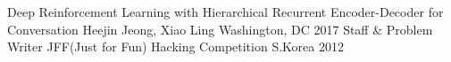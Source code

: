 \begin{cvhonors}
  \cvhonor
    {Deep Reinforcement Learning with Hierarchical Recurrent Encoder-Decoder for Conversation}
    {Heejin Jeong, Xiao Ling}
    {Washington, DC}
    {2017}
  \cvhonor
    {Staff \& Problem Writer}
    {JFF(Just for Fun) Hacking Competition}
    {S.Korea}
    {2012}
\end{cvhonors}
